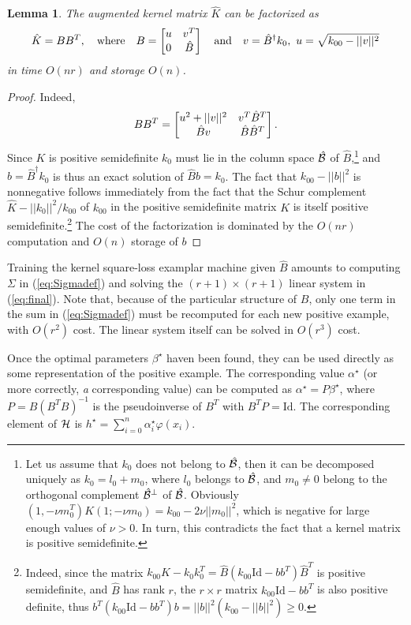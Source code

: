 \documentclass[12pt,letterpaper]{article}
\newtheorem{lemma}{Lemma}
\begin{document}
\begin{lemma}
The augmented kernel matrix $\hat{K}$ can be factorized as
\begin{equation}
\hat{K}=BB^T,\quad\text{where}\quad
B=\left[\begin{matrix}u & v^T\\0 & \hat{B}\end{matrix}\right]\quad\text{and}\quad
v=\hat{B}^\dagger k_0,\,\, u=\sqrt{k_{00}-||v||^2}
\end{equation}
in time $O(nr)$ and storage $O(n)$.
\end{lemma}
\begin{proof}
Indeed,
\begin{equation}
BB^T=\left[\begin{matrix}u^2+||v||^2 & v^T\hat{B}^T\\ \hat{B}v & \hat{B}\hat{B}^T\end{matrix}\right].
\end{equation}
Since $K$ is positive semidefinite $k_0$ must lie in the column space
$\cal \hat{B}$ of $\hat{B}$,\footnote{Let
us assume that $k_0$ does not belong to $\cal \hat{B}$, then it can be
decomposed uniquely as $k_0=l_0+m_0$, where $l_0$ belongs to $\cal \hat{B}$,
and $m_0\neq 0$ belong to the orthogonal complement $\cal \hat{B}^\perp$ of
$\cal \hat{B}$. Obviously $(1,-\nu m_0^T)K(1;-\nu m_0)=k_{00}-2\nu||m_0||^2$, which
is negative for large enough values of $\nu>0$. In turn, this contradicts the
fact that a kernel matrix is positive semidefinite.}
and $b=\hat{B}^\dagger k_0$ is thus an exact solution of
$\hat{B}b=k_0$.
The fact that $k_{00}-||b||^2$ is nonnegative follows immediately from
the fact that the Schur complement $\hat{K}-||k_0||^2/k_{00}$ of $k_{00}$ in
the positive semidefinite matrix $K$ is itself positive semidefinite.\footnote{Indeed,
since the matrix $k_{00}K-k_0k_0^T=\hat{B}(k_{00}\text{Id}-bb^T)\hat{B}^T$ is
positive semidefinite, and $\hat{B}$ has rank $r$, the $r\times r$ matrix
$k_{00}\text{Id}-bb^T$
is also positive definite, thus
$b^T(k_{00}\text{Id}-bb^T)b=||b||^2(k_{00}-||b||^2)\ge 0$.} The
cost of the factorization is dominated by the $O(nr)$ computation and $O(n)$ storage
of $b$
\end{proof}
 
Training the kernel square-loss examplar machine given $\hat{B}$ amounts to
computing
$\Sigma$ in (\ref{eq:Sigmadef}) and solving the $(r+1)\times (r+1)$
linear system in (\ref{eq:final}). Note that, because of the
particular structure of $B$, only one term in the sum in (\ref{eq:Sigmadef})
must be recomputed for each new positive example, with $O(r^2)$ cost.
The linear system itself can be solved in $O(r^3)$ cost.
 
Once the optimal parameters $\beta^\star$ haven been found, they can
be used directly as some representation of the positive example. The
corresponding value $\alpha^\star$ (or more correctly, {\em a}
corresponding value) can be computed as $\alpha^\star =P\beta^\star$,
where $P=B(B^TB)^{-1}$ is the pseudoinverse of $B^T$ with
$B^TP=\text{Id}$. The corresponding element of $\cal H$ is
$h^\star=\sum_{i=0}^n \alpha_i^\star\varphi(x_i)$.
 
\end{document}
